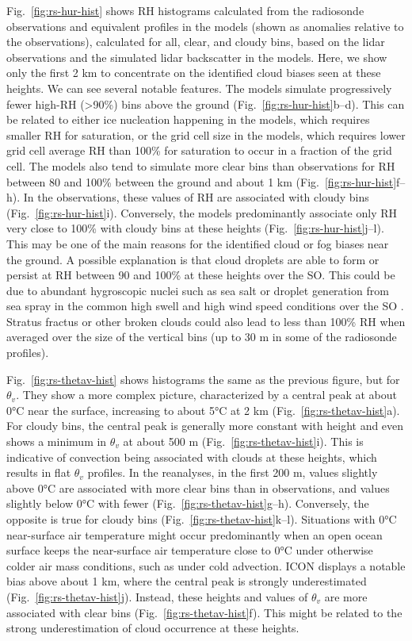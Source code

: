 \documentclass[draft]{agujournal2019}
\begin{document}
Fig.~\ref{fig:rs-hur-hist} shows RH histograms calculated from the radiosonde observations and equivalent profiles in the models (shown as anomalies relative to the observations), calculated for all, clear, and cloudy bins, based on the lidar observations and the simulated lidar backscatter in the models. Here, we show only the first 2 km to concentrate on the identified cloud biases seen at these heights. We can see several notable features. The models simulate progressively fewer high-RH (\textgreater 90\%) bins above the ground (Fig.~\ref{fig:rs-hur-hist}b--d). This can be related to either ice nucleation happening in the models, which requires smaller RH for saturation, or the grid cell size in the models, which requires lower grid cell average RH than 100\% for saturation to occur in a fraction of the grid cell. The models also tend to simulate more clear bins than observations for RH between 80 and 100\% between the ground and about 1 km (Fig.~\ref{fig:rs-hur-hist}f--h). In the observations, these values of RH are associated with cloudy bins (Fig.~\ref{fig:rs-hur-hist}i). Conversely, the models predominantly associate only RH very close to 100\% with cloudy bins at these heights (Fig.~\ref{fig:rs-hur-hist}j--l). This may be one of the main reasons for the identified cloud or fog biases near the ground. A possible explanation is that cloud droplets are able to form or persist at RH between 90 and 100\% at these heights over the SO. This could be due to abundant hygroscopic nuclei such as sea salt \cite{zieger2017,kong2018} or droplet generation from sea spray in the common high swell and high wind speed conditions over the SO \cite{revell2019,hartery2020}. Stratus fractus or other broken clouds could also lead to less than 100\% RH when averaged over the size of the vertical bins (up to 30 m in some of the radiosonde profiles).

Fig.~\ref{fig:rs-thetav-hist} shows histograms the same as the previous figure, but for $\theta_v$. They show a more complex picture, characterized by a central peak at about 0°C near the surface, increasing to about 5°C at 2 km (Fig.~\ref{fig:rs-thetav-hist}a). For cloudy bins, the central peak is generally more constant with height and even shows a minimum in $\theta_v$ at about 500 m (Fig.~\ref{fig:rs-thetav-hist}i). This is indicative of convection being associated with clouds at these heights, which results in flat $\theta_v$ profiles. In the reanalyses, in the first 200 m, values slightly above 0°C are associated with more clear bins than in observations, and values slightly below 0°C with fewer (Fig.~\ref{fig:rs-thetav-hist}g--h). Conversely, the opposite is true for cloudy bins (Fig.~\ref{fig:rs-thetav-hist}k--l). Situations with 0°C near-surface air temperature might occur predominantly when an open ocean surface keeps the near-surface air temperature close to 0°C under otherwise colder air mass conditions, such as under cold advection. ICON displays a notable bias above about 1 km, where the central peak is strongly underestimated (Fig.~\ref{fig:rs-thetav-hist}j). Instead, these heights and values of $\theta_v$ are more associated with clear bins (Fig.~\ref{fig:rs-thetav-hist}f). This might be related to the strong underestimation of cloud occurrence at these heights.
\end{document}
